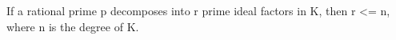 If a rational prime p decomposes into r prime ideal factors in K, then r <= n, where n is the degree of K.
